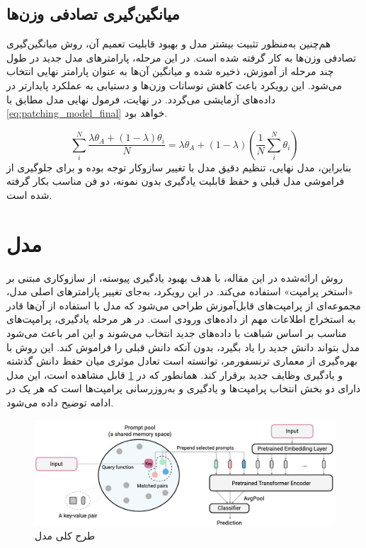 \subsection{میانگین‌گیری تصادفی وزن‌ها}
هم‌چنین به‌منظور تثبیت بیشتر مدل و بهبود قابلیت تعمیم آن، روش میانگین‌گیری تصادفی وزن‌ها به کار گرفته شده است. در این مرحله، پارامتر‌های مدل جدید در طول چند مرحله از آموزش، ذخیره شده و میانگین آن‌ها به عنوان پارامتر نهایی انتخاب می‌شود. این رویکرد باعث کاهش نوسانات وزن‌ها و دستیابی به عملکرد پایدارتر در داده‌های آزمایشی می‌گردد. در نهایت، فرمول نهایی مدل مطابق با \eqref{eq:patching_model_final} خواهد بود.

\begin{equation}\label{eq:patching_model_final}
	\sum_{i}^{N} \frac{\lambda \theta_{A} + (1 - \lambda) \theta_{i}}{N}
	= \lambda \theta_{A} + (1 - \lambda)
	\left( \frac{1}{N} \sum_{i}^{N} \theta_{i} \right)
\end{equation}
بنابراین، مدل نهایی، تنظیم دقیق مدل  با تغییر سازوکار توجه بوده و برای جلوگیری از فراموشی مدل قبلی و حفظ قابلیت یادگیری بدون نمونه، دو فن مناسب بکار گرفته شده است. 
\section{مدل }
روش ارائه‌شده در این مقاله، با هدف بهبود یادگیری پیوسته، از سازوکاری مبتنی بر «استخر پرامپت‌» استفاده می‌کند. در این رویکرد، به‌جای تغییر پارامتر‌های اصلی مدل، مجموعه‌ای از پرامپت‌های قابل‌آموزش طراحی می‌شود که مدل با استفاده از آن‌ها قادر به استخراج اطلاعات مهم از داده‌های ورودی است. در هر مرحله یادگیری، پرامپت‌های مناسب بر اساس شباهت با داده‌های جدید انتخاب می‌شوند و این امر باعث می‌شود مدل بتواند دانش جدید را یاد بگیرد، بدون آنکه دانش قبلی را فراموش کند. این روش با بهره‌گیری از معماری ترنسفورمر، توانسته است تعادل موثری میان حفظ دانش گذشته و یادگیری وظایف جدید برقرار کند. همانطور که در \cref{fig.32} قابل مشاهده است، این مدل دارای دو بخش انتخاب پرامپت‌ها و یادگیری و به‌روزرسانی پرامپت‌ها است که هر یک در ادامه توضیح داده‌ می‌شود.
‌\begin{figure}
	\centering\includegraphics[scale=.38]{Images/Chapter3/l2p.png}
	\caption[]{ طرح کلی مدل  \cite{l2p}}
	\label{fig.32}
\end{figure}

